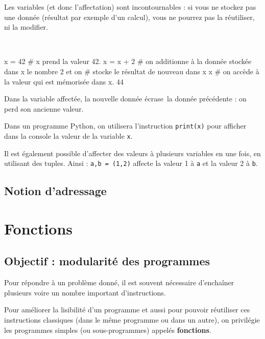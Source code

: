 Les variables (et donc l'affectation) sont incontournables : si vous ne stockez pas une donnée 
(résultat par exemple d'un calcul), vous ne pourrez pas la réutiliser, ni la modifier.



\begin{xxpyconsole}~\\ \vspace{-.5cm}%
\begin{pyconsole}
x = 42       # x prend la valeur 42.
x = x + 2	# on additionne à la donnée stockée dans x le nombre 2 et on 
             # stocke le résultat de nouveau dans x 
x            # on accède à la valeur qui est mémorisée dans x.
44
\end{pyconsole}
\end{xxpyconsole}

Dans la variable affectée, la nouvelle donnée \og écrase\fg\ la donnée précédente : on perd son 
ancienne valeur.

Dans un programme Python, on utilisera l'instruction \texttt{print(x)}
pour afficher dans la console la valeur de la variable \texttt{x}.

Il est également possible d'affecter des valeurs à plusieurs variables en une fois, en utilisant 
des tuples. Ainsi : \texttt{a,b = (1,2)} affecte la valeur 1 à \texttt{a} et la valeur 2 à 
\texttt{b}.


\subsection{Notion d'adressage}

\section{Fonctions}
\subsection{Objectif : modularité des programmes}

Pour répondre à un problème donné, il est souvent nécessaire d'enchaîner plusieurs voire un nombre 
important d'instructions.

Pour améliorer la lisibilité d'un programme et aussi pour pouvoir réutiliser 
ces instructions classiques (dans le même programme ou dans un autre),
on privilégie les programmes simples (ou sous-programmes) appelés \textbf{fonctions}.

